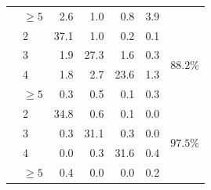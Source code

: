 \begin{tabular}{llrrrrr}
 & $\geq 5$ & 2.6 & 1.0 & 0.8 & 3.9 &  \\
\addlinespace
\multirow{4}{*}{6} & 2 & 37.1 & 1.0 & 0.2 & 0.1 & \multirow{4}{*}{$88.2\%$} \\
 & 3 & 1.9 & 27.3 & 1.6 & 0.3 &  \\
 & 4 & 1.8 & 2.7 & 23.6 & 1.3 &  \\
 & $\geq 5$ & 0.3 & 0.5 & 0.1 & 0.3 &  \\
\addlinespace
\multirow{4}{*}{10} & 2 & 34.8 & 0.6 & 0.1 & 0.0 & \multirow{4}{*}{$97.5\%$} \\
 & 3 & 0.3 & 31.1 & 0.3 & 0.0 &  \\
 & 4 & 0.0 & 0.3 & 31.6 & 0.4 &  \\
 & $\geq 5$ & 0.4 & 0.0 & 0.0 & 0.2 &  \\
\bottomrule
\end{tabular}
